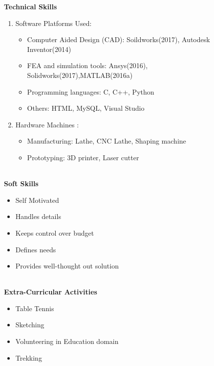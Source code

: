 \documentclass[letterpaper,11pt]{article}
\newcommand{\SmallSep}{\vspace{0.5em}}
\newcommand{\CVSection}[1]
{\Large\textbf{#1}\par
	\SmallSep\normalsize\normalfont}
\begin{document}
\CVSection{Technical Skills}

\begin{enumerate}
	\item Software Platforms Used:\\
	\begin{itemize}
		\item Computer Aided Design (CAD):
		Soildworks(2017), Autodesk Inventor(2014)	
		\item FEA and simulation tools:
		Ansys(2016), Solidworks(2017),MATLAB(2016a)
		\item Programming languages: 
		C, C++, Python
		\item Others: 
		HTML, MySQL, Visual Studio
		
	\end{itemize}
	
	\item Hardware Machines : 
	\begin{itemize}
		\item Manufacturing: Lathe, CNC Lathe, Shaping machine
		\item Prototyping: 3D printer, Laser cutter
		
	\end{itemize}
\end{enumerate}
\textbf{}  \\

\CVSection{Soft Skills}

\begin{itemize}
	\item Self Motivated
	\item Handles details  
	\item Keeps control over budget
	\item Defines needs
	\item Provides well-thought out solution
\end{itemize}
\textbf{}  \\

\CVSection{Extra-Curricular Activities}

\begin{itemize}
	\item Table Tennis
	\item Sketching 
	\item Volunteering in Education domain
	\item Trekking 
\end{itemize}
\textbf{}  \\
\textbf{}  \\
\end{document}
